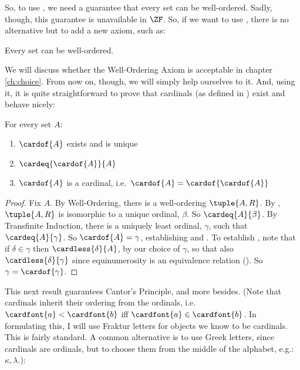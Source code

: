 \documentclass[../../../include/open-logic-section]{subfiles}
\begin{document}
So, to use , we need a guarantee that every set can be well-ordered. Sadly, though, this guarantee is unavailable in $\ZF$. So, if we want to use , there is no alternative but to add a new axiom, such as:
\begin{axiom*}
	Every set can be well-ordered.
\end{axiom*}\noindent
We will discuss whether the Well-Ordering Axiom is acceptable in chapter \ref{ch:choice}. From now on, though, we will simply help ourselves to it. And, using it, it is quite straightforward to prove that cardinals (as defined in ) exist and behave nicely:
\begin{lem}For every set $A$:
	\begin{enumerate}
		\item{} $\cardof{A}$ exists and is unique
		\item{}  $\cardeq{\cardof{A}}{A}$
		\item{}  $\cardof{A}$ is a cardinal, i.e.\ $\cardof{A} = \cardof{\cardof{A}}$
	\end{enumerate}
\end{lem}
\begin{proof}
	Fix $A$. By Well-Ordering, there is a well-ordering $\tuple{A, R}$. By , $\tuple{A, R}$ is isomorphic to a unique ordinal, $\beta$. So  $\cardeq{A}{\beta}$. By Transfinite Induction, there is a uniquely least ordinal, $\gamma$, such that $\cardeq{A}{\gamma}$. So $\cardof{A} = \gamma$, establishing  and . To establish , note that if $\delta \in \gamma$ then $\cardless{\delta}{A}$, by our choice of $\gamma$, so that also $\cardless{\delta}{\gamma}$ since equinumerosity is an equivalence relation (). So $\gamma = \cardof{\gamma}$. %
\end{proof}\noindent
This next result guarantees Cantor's Principle, and more besides. (Note that cardinals inherit their ordering from the ordinals, i.e.\ $\cardfont{a} < \cardfont{b}$ iff $\cardfont{a} \in \cardfont{b}$. In formulating this, I will use Fraktur letters for objects we know to be cardinals. This is fairly standard. A common alternative is to use Greek letters, since cardinals are ordinals, but to choose them from the middle of the alphabet, e.g.: $\kappa, \lambda$.):
\end{document}

